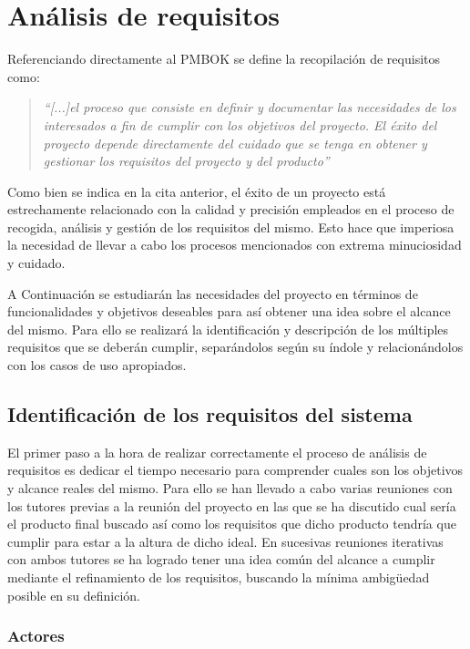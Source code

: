 \chapter{Análisis de requisitos}

Referenciando directamente al PMBOK \cite{pmbok} se define la recopilación de requisitos como:

\begin{quote}
	\textit{
	“[...]el proceso que consiste en definir y documentar las necesidades de los interesados
	a fin de cumplir con los objetivos del proyecto. El éxito del proyecto depende directamente
	del cuidado que se tenga en obtener y gestionar los requisitos del proyecto y del
	producto”
	}
\end{quote}

Como bien se indica en la cita anterior, el éxito de un proyecto está estrechamente relacionado con la calidad y precisión empleados en el proceso de recogida, análisis y gestión de los requisitos del mismo. Esto hace que imperiosa la necesidad de llevar a cabo los procesos mencionados con extrema minuciosidad y cuidado.

\bigskip

A Continuación se estudiarán las necesidades del proyecto en términos de funcionalidades y objetivos deseables para así obtener una idea sobre el alcance del mismo. Para ello se realizará la identificación y descripción de los múltiples requisitos que se deberán cumplir, separándolos según su índole y relacionándolos con los casos de uso apropiados.

\section{Identificación de los requisitos del sistema}

El primer paso a la hora de realizar correctamente el proceso de análisis de requisitos es dedicar el tiempo necesario para comprender cuales son los objetivos y alcance reales del mismo. Para ello se han llevado a cabo varias reuniones con los tutores previas a la reunión del proyecto en las que se ha discutido cual sería el producto final buscado así como los requisitos que dicho producto tendría que cumplir para estar a la altura de dicho ideal. En sucesivas reuniones iterativas con ambos tutores se ha logrado tener una idea común del alcance a cumplir mediante el refinamiento de los requisitos, buscando la mínima ambigüedad posible en su definición.

\subsection{Actores}

